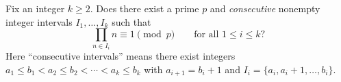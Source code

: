 Fix an integer $k\ge 2$.
Does there exist a prime $p$ and \emph{consecutive} nonempty integer intervals $I_1,\dots,I_k$ such that
\[
\prod_{n\in I_i} n \equiv 1 \pmod p\qquad\text{for all }1\le i\le k?
\]
Here “consecutive intervals” means there exist integers $a_1\le b_1 < a_2\le b_2 < \cdots < a_k\le b_k$ with $a_{i+1}=b_i+1$ and $I_i=\{a_i,a_i+1,\dots,b_i\}$.
